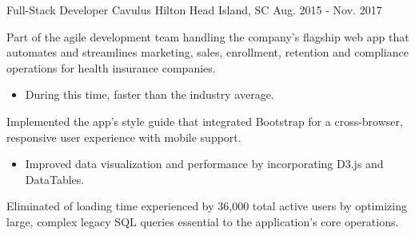 \begin{cventries}
  \cventry
    {Full-Stack Developer} %
    {Cavulus} %
    {Hilton Head Island, SC} %
    {Aug. 2015 - Nov. 2017} %
    {
      \begin{cvitems} %
        \item {Part of the agile development team handling the company's flagship web app that automates and streamlines marketing, sales, enrollment, retention and compliance operations for health insurance companies.}
        \begin{itemize}
          \vspace{1.0mm}
          \item {During this time,  faster than the industry average.}
        \end{itemize}
        \item {Implemented the app's style guide that integrated Bootstrap for a cross-browser, responsive user experience with mobile support.}
        \begin{itemize}
          \vspace{1.0mm}
          \item {Improved data visualization and performance by incorporating D3.js and DataTables.}
        \end{itemize}
        \item {Eliminated  of loading time experienced by 36,000 total active users by optimizing large, complex legacy SQL queries essential to the application's core operations.}

\end{cvitems}}
\end{cventries}
